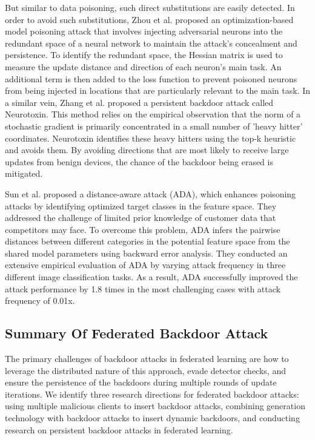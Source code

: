 \documentclass[conference]{IEEEtran}
\begin{document}
But similar to data poisoning, such direct substitutions are easily detected.
In order to avoid such substitutions,
Zhou et al.\cite{b63} proposed an optimization-based model poisoning attack that
involves injecting adversarial neurons into the redundant space of a neural network
to maintain the attack's concealment and persistence. To identify the redundant
space, the Hessian matrix is used to measure the update distance and direction of each neuron's main task.
An additional term is then added to the loss function to prevent poisoned neurons from being injected
in locations that are particularly relevant to the main task.
In a similar vein, Zhang et al.\cite{b62}
proposed a persistent backdoor attack called Neurotoxin. This method
relies on the empirical observation that the norm of a stochastic gradient
is primarily concentrated in a small number of 'heavy hitter' coordinates.
Neurotoxin identifies these heavy hitters using the top-k heuristic and
avoids them. By avoiding directions that are most likely to receive large
updates from benign devices, the chance of the backdoor being erased is mitigated.

Sun et al. \cite{b65}proposed a distance-aware attack (ADA), which enhances poisoning attacks
by identifying optimized target classes in the feature space. They addressed the challenge of
limited prior knowledge of customer data that competitors may face. To overcome this problem,
ADA infers the pairwise distances between different categories in the potential feature space
from the shared model parameters using backward error analysis. They conducted an extensive
empirical evaluation of ADA by varying attack frequency in three different image classification
tasks. As a result, ADA successfully improved the attack performance by 1.8 times in the most
challenging cases with attack frequency of 0.01x.

\subsection{Summary Of Federated Backdoor Attack}
The primary challenges of backdoor attacks in federated learning are how
to leverage the distributed nature of this approach, evade detector checks,
and ensure the persistence of the backdoors during multiple rounds of update
iterations. We identify three research directions for federated backdoor
attacks: using multiple malicious clients to insert backdoor attacks,
combining generation technology with backdoor attacks to insert dynamic backdoors, and conducting
research on persistent backdoor attacks in federated learning.
\end{document}
